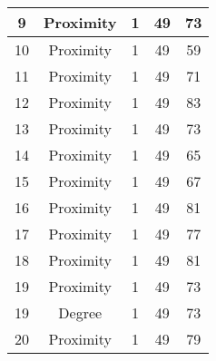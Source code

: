 \documentclass[results.tex]{subfiles}
\begin{document}
\begin{center}
\begin{tabular}{| c || c | c | c | c |}
            \hline
            9                       & Proximity                    & 1                      & 49                      & 73                   \\
            \hline
            10                      & Proximity                    & 1                      & 49                      & 59                   \\
            \hline
            11                      & Proximity                    & 1                      & 49                      & 71                   \\
            \hline
            12                      & Proximity                    & 1                      & 49                      & 83                   \\
            \hline
            13                      & Proximity                    & 1                      & 49                      & 73                   \\
            \hline
            14                      & Proximity                    & 1                      & 49                      & 65                   \\
            \hline
            15                      & Proximity                    & 1                      & 49                      & 67                   \\
            \hline
            16                      & Proximity                    & 1                      & 49                      & 81                   \\
            \hline
            17                      & Proximity                    & 1                      & 49                      & 77                   \\
            \hline
            18                      & Proximity                    & 1                      & 49                      & 81                   \\
            \hline
            19                      & Proximity                    & 1                      & 49                      & 73                   \\
            \hline
            19                      & Degree                       & 1                      & 49                      & 73                   \\
            \hline
            20                      & Proximity                    & 1                      & 49                      & 79                   \\

\end{tabular}
\end{center}
\end{document}
